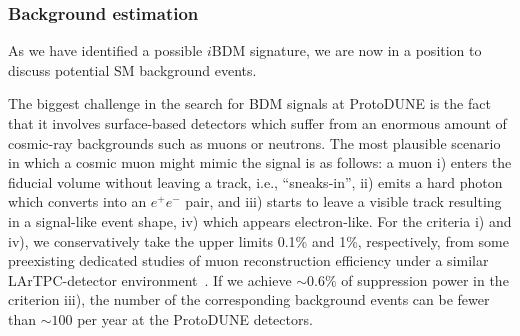\subsubsection{Background estimation}

As we have identified a possible $i$BDM signature, we are now in a position to discuss potential SM background events. 

The biggest challenge in the search for BDM signals at ProtoDUNE is the fact that it involves surface-based detectors which suffer from an enormous amount of cosmic-ray backgrounds such as muons or neutrons.
The most plausible scenario in which a cosmic muon might mimic the signal is as follows: a muon i) enters the fiducial volume without leaving a track, i.e., ``sneaks-in'', ii) emits a hard photon which converts into an $e^+ e^-$ pair, and iii) starts to leave a visible track resulting in a signal-like event shape, iv) which appears electron-like.
For the criteria i) and iv), we conservatively take the upper limits 0.1\% and 1\%, respectively, from some preexisting dedicated studies of muon reconstruction efficiency under a similar LArTPC-detector environment~\cite{MicroBooNEmuon, Acciarri:2016sli}.
If we achieve $\sim 0.6\%$ of suppression power in the criterion iii), the number of the corresponding background events can be fewer than $\sim 100$ per year at the ProtoDUNE detectors.

